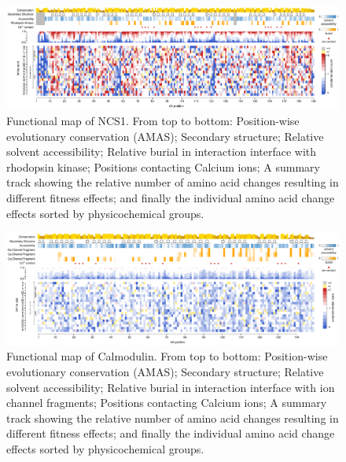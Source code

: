 \begin{appendices}
\begin{landscape}
\begin{figure}[h]
	\centering
	\includegraphics[width=9in]{img/ncs1_map_noflip.pdf}
	\caption{Functional map of NCS1. From top to bottom: Position-wise evolutionary conservation (AMAS); Secondary structure; Relative solvent accessibility; Relative burial in interaction interface with rhodopsin kinase; Positions contacting Calcium ions; A summary track showing the relative number of amino acid changes resulting in different fitness effects; and finally the individual amino acid change effects sorted by physicochemical groups.}
\end{figure}
\end{landscape}


\begin{landscape}
\begin{figure}[h]
	\centering
	\includegraphics[width=9in]{img/calm1_map_noflip.pdf}
	\caption{Functional map of Calmodulin. From top to bottom: Position-wise evolutionary conservation (AMAS); Secondary structure; Relative solvent accessibility; Relative burial in interaction interface with ion channel fragments; Positions contacting Calcium ions; A summary track showing the relative number of amino acid changes resulting in different fitness effects; and finally the individual amino acid change effects sorted by physicochemical groups.}
\end{figure}
\end{landscape}

\end{appendices}